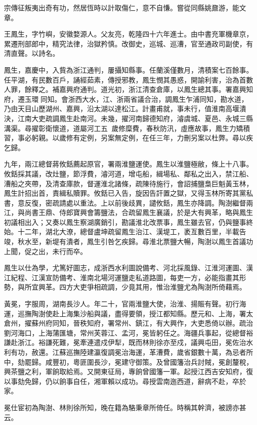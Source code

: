 \begin{pinyinscope}
宗傳征叛夷出奇有功，然居恆時以計取傷仁，意不自慊。嘗從同縣姚鼐游，能文章。

王鳳生，字竹嶼，安徽婺源人。父友亮，乾隆四十六年進士。由中書充軍機章京，累遷刑部郎中，精究法律，治獄矜慎。改御史，巡城、巡漕，官至通政司副使，有清直聲。以詩名。

鳳生，嘉慶中，入貲為浙江通判，屢攝知縣事。任蘭溪僅數月，清積案七百餘事。任平湖，有民數百戶，誦經茹素，傳授邪教，鳳生憫其愚惑，開諭利害，治為首數人罪，餘釋之。補嘉興府通判。道光初，浙江清查倉庫，以鳳生總其事。署嘉興知府，遷玉環同知。會浙西大水，江、浙兩省議合治，調鳳生乍浦同知，勘水道，乃由天目山歷湖州、嘉興，沿太湖以達松江。計畫甫就，事未行，值淮南高堰潰決，江南大吏疏調鳳生赴南河。未幾，擢河南歸德知府，濬虞城、夏邑、永城三縣溝渠。尋擢彰衛懷道，道屬河工五，歲修糜費，春秋防汛，虛應故事，鳳生力矯積習，事必躬親。以歲修有定例，另案無定例，在任三年，力刪另案以杜弊。尋以疾乞歸。

九年，兩江總督蔣攸銛薦起原官，署兩淮鹽運使。鳳生以淮鹽極敝，條上十八事。攸銛採其議，改灶鹽，節浮費，濬河道，增屯船，緝場私、鄰私之出入，禁江船、漕船之夾帶，及清查庫款，督運淮北諸條，疏陳待施行，會詔捕鹽梟巨魁黃玉林，鳳生計招出首，責緝私贖罪。攸銛已入告，旋因告訐置之獄，又得玉林所寄其黨私書，意反復，密疏請處以重法。上以前後歧異，譴攸銛，鳳生亦降調。陶澍繼督兩江，與尚書王鼎、侍郎寶興會籌鹽法，合疏留鳳生襄議，於是大有興革，略與鳳生初議相出入；又奏以鳳生察湖廣銷引，勘議淮北改票事，鳳生雖去官，仍與鹽事終始。十二年，湖北大潦，總督盧坤疏留鳳生治江、漢堤工，袤亙數百里，半載告竣，秋水至，新堤有潰者，鳳生引咎乞疾歸。尋淮北票鹽大暢，陶澍以鳳生首議功上聞，促之出，未行而卒。

鳳生以仕為學，尤篤好圖志，成浙西水利圖說備考、河北採風錄、江淮河運圖、漢江紀程、江漢宣防備考、淮南北場河運鹽走私道路圖，每吏一方，必能指畫其形勢，與所宜興革。四方大吏爭相疏調，少竟其用，惟治淮鹽尤為陶澍所倚藉焉。

黃冕，字服周，湖南長沙人。年二十，官兩淮鹽大使，治淮、揚賑有聲。初行海運，巡撫陶澍使赴上海集沙船與議，盡得要領，授江都知縣。歷元和、上海，署太倉州，擢蘇州府同知，晉秩知府，署常州、鎮江，有大興作，大吏悉倚以辦。疏治劉河海口，上海蒲匯塘，常州芙蓉江、孟河，冕皆躬任之。海疆兵事起，從總督裕謙赴浙江。裕謙死難，冕牽連遣戍伊犁，既而林則徐亦至戍，議興屯田，冕佐治水利有功，赦還。江蘇巡撫陸建瀛復調冕治海運，革漕費，歲省銀數十萬，為忌者所中，劾罷歸。咸豐初，粵匪圍長沙，冕建守御策。及曾國籓治兵討賊，冕創釐稅，興茶鹽之利，軍餉取給焉。又開東征局，專餉曾國籓一軍。起授江西吉安知府，復以事劾免歸，仍以餉事自任，湘軍賴以成功。尋授雲南迤西道，辭病不赴，卒於家。

冕仕宦初為陶澍、林則徐所知，晚在籍為駱秉章所倚任。時稱其幹濟，被謗亦甚云。


\end{pinyinscope}
